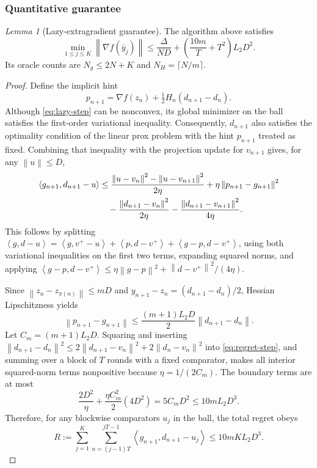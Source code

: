 \documentclass[11pt]{article}
\newtheorem{lemma}[theorem]{Lemma}
\theoremstyle{remark}
\newtheorem{lemma}[lemma]{Lemma}
\theoremstyle{remark}
\newcommand{\norm}[1]{\left\lVert#1\right\rVert}
\newcommand{\ip}[2]{\left\langle#1,#2\right\rangle}
\begin{document}
\subsubsection{Quantitative guarantee}
\begin{lemma}[Lazy-extragradient guarantee]\label{lem:lazy-bound}
The algorithm above satisfies
\begin{equation}\label{eq:lazy-bound}
 \min_{1\le j\le K}\norm{\nabla f(\bar y_j)}
 \le\frac{\Delta}{ND}
 +\left(\frac{10m}{T}+T^2\right)L_2D^2.
\end{equation}
Its oracle counts are $N_g\le2N+K$ and $N_H=\lceil N/m\rceil$.
\end{lemma}
\begin{proof}
Define the implicit hint
\[
 p_{n+1}=\nabla f(z_n)+\tfrac12H_n(d_{n+1}-d_n).
\]
Although \eqref{eq:lazy-step} can be nonconvex, its global minimizer on the ball satisfies the first-order variational inequality. Consequently, $d_{n+1}$ also satisfies the optimality condition of the linear prox problem with the hint $p_{n+1}$ treated as fixed. Combining that inequality with the projection update for $v_{n+1}$ gives, for any $\norm{u}\le D$,
\begin{align}\label{eq:regret-step}
 \ip{g_{n+1}}{d_{n+1}-u}
 &\le\frac{\norm{u-v_n}^2-\norm{u-v_{n+1}}^2}{2\eta}
 +\eta\norm{p_{n+1}-g_{n+1}}^2\notag\\
 &\quad-\frac{\norm{d_{n+1}-v_n}^2}{2\eta}
       -\frac{\norm{d_{n+1}-v_{n+1}}^2}{4\eta}.
\end{align}
This follows by splitting
$\ip{g}{d-u}=\ip{g}{v^+-u}+\ip{p}{d-v^+}+\ip{g-p}{d-v^+}$,
using both variational inequalities on the first two terms, expanding squared norms, and applying
$\ip{g-p}{d-v^+}\le\eta\norm{g-p}^2+\norm{d-v^+}^2/(4\eta)$.

Since $\norm{z_n-z_{\pi(n)}}\le mD$ and $y_{n+1}-z_n=(d_{n+1}-d_n)/2$, Hessian Lipschitzness yields
\[
 \norm{p_{n+1}-g_{n+1}}
 \le\frac{(m+1)L_2D}{2}\norm{d_{n+1}-d_n}.
\]
Let $C_m=(m+1)L_2D$. Squaring and inserting
$\norm{d_{n+1}-d_n}^2\le2\norm{d_{n+1}-v_n}^2+2\norm{d_n-v_n}^2$
into \eqref{eq:regret-step}, and summing over a block of $T$ rounds with a fixed comparator, makes all interior squared-norm terms nonpositive because $\eta=1/(2C_m)$. The boundary terms are at most
\[
 \frac{2D^2}{\eta}+\frac{\eta C_m^2}{2}(4D^2)
 =5C_mD^2\le10mL_2D^3.
\]
Therefore, for any blockwise comparators $u_j$ in the ball, the total regret obeys
\begin{equation}\label{eq:regret}
 R:=\sum_{j=1}^K\sum_{n=(j-1)T}^{jT-1}
 \ip{g_{n+1}}{d_{n+1}-u_j}\le10mKL_2D^3.
\end{equation}


\end{proof}
\end{document}
